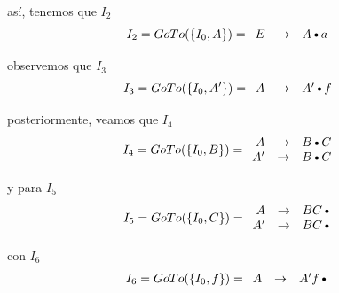 así, tenemos que $I_2$
\[
I_2 = GoTo(\{I_0,A\}) = 
\begin{array}{rcl}
  E  & \to & A\text{\textbullet}a \\
\end{array}
\]

observemos que $I_3$
\[
I_3 = GoTo(\{I_0,A'\}) = 
\begin{array}{rcl}
  A  & \to &  A'\text{\textbullet}f \\ %
\end{array}
\]


posteriormente, veamos que $I_4$
\[
I_4 = GoTo(\{I_0,B\}) = 
\begin{array}{rcl}
  A  & \to & B\text{\textbullet}C\\
  A' & \to & B\text{\textbullet}C\\
\end{array}
\]

y para $I_5$
\[
I_5 = GoTo(\{I_0,C\}) = 
\begin{array}{rcl}
  A  & \to & BC\text{\textbullet}\\
  A' & \to & BC\text{\textbullet}\\
\end{array}
\]

con $I_6$
\[
I_6 = GoTo(\{I_0,f\}) = 
\begin{array}{rcl}
  A & \to & A'f\text{\textbullet}\\
\end{array}
\]

